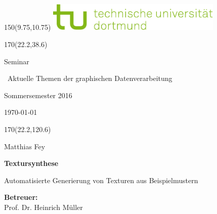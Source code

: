 \begin{titlepage}

\begin{textblock}{150}(9.75,10.75)
	\includegraphics[width=83.5mm]{images/tud_logo.pdf}
\end{textblock}

\begin{textblock}{170}(22.2,38.6)%
\begin{minipage}{170mm}
    \vfill 
    \sf
    \begin{center}
    \begin{onehalfspace}{\huge Seminar}\end{onehalfspace}
    \vspace{1.0cm}
    \begin{onehalfspace}{\Large\ Aktuelle Themen der graphischen Datenverarbeitung}\end{onehalfspace}
    \vspace{0.5cm}
    \begin{onehalfspace}{\Large Sommersemester 2016}\end{onehalfspace}
    \vspace{1cm}
    \today
    \end{center}
    \vfill
\end{minipage}\end{textblock}

\begin{textblock}{170}(22.2,120.6)
\begin{minipage}{170mm}
\raggedright\sf
    \begin{onehalfspace}{\Large Matthias Fey}\end{onehalfspace}
    \vspace{0.5cm}
    \begin{onehalfspace}{\Large \textbf{Textursynthese}}\end{onehalfspace}
    \vspace{0.2cm}
    \begin{onehalfspace}{\Large Automatisierte Generierung von Texturen aus Beispielmustern}\end{onehalfspace}
    \vspace{1cm}
    \textbf{Betreuer:}\\
    Prof. Dr. Heinrich Müller\\
    \vfill
\end{minipage}\end{textblock}


\end{titlepage}
